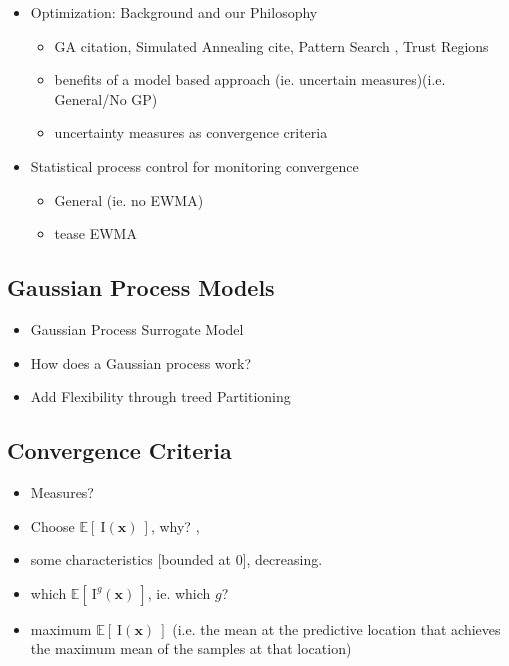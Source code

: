 \documentclass[12pt]{article}
\newcommand{\E}[1]{
        \mathbb{E}\left[#1\right]
}
\def \EIx {
	\mathbb{E}\left[~\text{I}(\bm{x})~\right]
}
\begin{document}
	\begin{itemize}
	\item Optimization: Background and our Philosophy
		\begin{itemize}
		\item GA {\color{red} citation}, Simulated Annealing {\color{red} cite}, Pattern Search \cite{noGradBook}, Trust Regions \cite{noGradBook} 
		\item benefits of a model based approach (ie. uncertain measures)(i.e. General/No GP)
		\item uncertainty measures as convergence criteria
		\end{itemize}
	\item Statistical process control for monitoring convergence
		\begin{itemize}
		\item General \cite{shewhartBook} (ie. no EWMA)
		\item tease EWMA
		\end{itemize}
	\end{itemize}
	\subsection{Gaussian Process Models}
	\begin{itemize}
	\item Gaussian Process Surrogate Model
	\item How does a Gaussian process work? \cite{gpJasa}
	\item Add Flexibility through treed Partitioning \cite{tgp}
	\end{itemize}
	\subsection{Convergence Criteria}
	\begin{itemize}
	\item Measures?
	\item Choose $\EIx$, why? \cite{gBook}, \cite{tgp2}
	\item some characteristics [bounded at 0], decreasing.
	\item which $\E{~\text{I}^g(\bm{x})~}$, ie. which $g$? \cite{gBook}
	\item maximum $\EIx$ (i.e. the mean at the predictive location that achieves the maximum mean of the samples at that location)
	\end{itemize}
\end{document}
